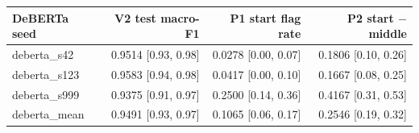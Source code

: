 \begin{tabular}{lrrr}
\toprule
\textbf{DeBERTa seed} & \textbf{V2 test macro-F1} & \textbf{P1 start flag rate} & \textbf{P2 start $-$ middle} \\
\midrule
deberta\_s42 & 0.9514 {\scriptsize[0.93, 0.98]} & 0.0278 {\scriptsize[0.00, 0.07]} & 0.1806 {\scriptsize[0.10, 0.26]} \\
deberta\_s123 & 0.9583 {\scriptsize[0.94, 0.98]} & 0.0417 {\scriptsize[0.00, 0.10]} & 0.1667 {\scriptsize[0.08, 0.25]} \\
deberta\_s999 & 0.9375 {\scriptsize[0.91, 0.97]} & 0.2500 {\scriptsize[0.14, 0.36]} & 0.4167 {\scriptsize[0.31, 0.53]} \\
deberta\_mean & 0.9491 {\scriptsize[0.93, 0.97]} & 0.1065 {\scriptsize[0.06, 0.17]} & 0.2546 {\scriptsize[0.19, 0.32]} \\
\bottomrule
\end{tabular}
